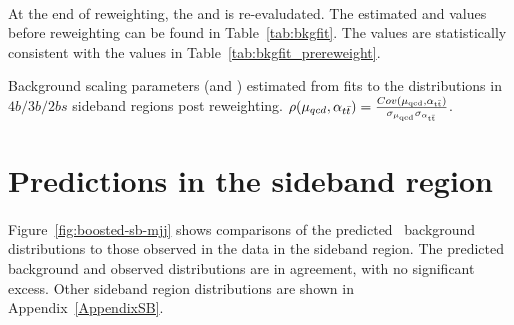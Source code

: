 \paragraph{}
At the end of reweighting, the \muqcd and \alphatt is re-evaludated. The estimated \muqcd and \alphatt values before reweighting can be found in Table~\ref{tab:bkgfit}. 
The values are statistically consistent with the values in Table~\ref{tab:bkgfit_prereweight}. 

\begin{table}[htbp!]
\begin{center}
\caption{Background scaling parameters (\muqcd and \alphatt) estimated from fits to the \mleadJ distributions in $4b/3b/2bs$ sideband regions post reweighting. $\rho(\mu_{qcd},\alpha_{t\bar{t}}) = \frac{Cov(\rm \mu_{qcd},\rm \alpha_{\rm t\bar{t}})}{\rm \sigma_{\mu_{qcd}} \rm \sigma_{\alpha_{\rm t\bar{t}}} }$.}

\label{tab:bkgfit}
\end{center}
\end{table}



\section{Predictions in the sideband region}
\label{sec:boosted-sb}

\paragraph{}
Figure~\ref{fig:boosted-sb-mjj} shows comparisons of the predicted \mtwoJ~background distributions to those observed in the data in the sideband region.
The predicted background and observed distributions are in agreement, with no significant excess.
Other sideband region distributions are shown in Appendix~\ref{AppendixSB}.


